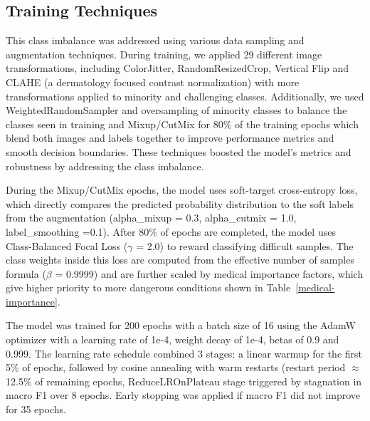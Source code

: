 \documentclass{article} %
\begin{document}
\subsection{Training Techniques}
\label{subsec:training_techniques}

This class imbalance was addressed using various data sampling and augmentation techniques. During training, we applied 29 different image transformations, including ColorJitter, RandomResizedCrop, Vertical Flip and CLAHE (a dermatology focused contrast normalization) with more transformations applied to minority and challenging classes. Additionally, we used WeightedRandomSampler and oversampling of minority classes to balance the classes seen in training and Mixup/CutMix for 80\% of the training epochs which blend both images and labels together to improve performance metrics and smooth decision boundaries. These techniques boosted the model's metrics and robustness by addressing the class imbalance.

During the Mixup/CutMix epochs, the model uses soft-target cross-entropy loss, which directly compares the predicted probability distribution to the soft labels from the augmentation (alpha\_mixup = 0.3, alpha\_cutmix = 1.0, label\_smoothing =0.1). After 80\% of epochs are completed, the model uses Class-Balanced Focal Loss ($\gamma$ = 2.0) to reward classifying difficult samples. The class weights inside this loss are computed from the effective number of samples formula ($\beta$ = 0.9999) and are further scaled by medical importance factors, which give higher priority to more dangerous conditions shown in Table~\ref{medical-importance}.

The model was trained for 200 epochs with a batch size of 16 using the AdamW optimizer with a learning rate of 1e-4, weight decay of 1e-4, betas of 0.9 and 0.999. The learning rate schedule combined 3 stages: a linear warmup for the first 5\% of epochs, followed by cosine annealing with warm restarts (restart period $\approx$ 12.5\% of remaining epochs, ReduceLROnPlateau stage triggered by stagnation in macro F1 over 8 epochs. Early stopping was applied if macro F1 did not improve for 35 epochs.
\end{document}
